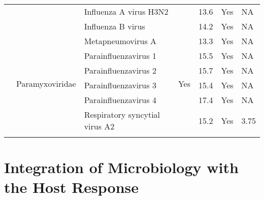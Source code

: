 \begin{center}
\begin{landscape}
\begin{table}[]
{\begin{tabular}{|l|l|l|l|l|l|l|}
                           &                                   & Influenza A virus H3N2         &                      & 13.6        & Yes                  & NA                                           \\ \cline{3-3} \cline{5-7} 
                           &                                   & Influenza B virus              &                      & 14.2        & Yes                  & NA                                           \\ \cline{2-7} 
                           & \multirow{6}{*}{Paramyxoviridae}  & Metapneumovirus A              & \multirow{6}{*}{Yes} & 13.3        & Yes                  & NA                                           \\ \cline{3-3} \cline{5-7} 
                           &                                   & Parainfluenzavirus 1           &                      & 15.5        & Yes                  & NA                                           \\ \cline{3-3} \cline{5-7} 
                           &                                   & Parainfluenzavirus 2           &                      & 15.7        & Yes                  & NA                                           \\ \cline{3-3} \cline{5-7} 
                           &                                   & Parainfluenzavirus 3           &                      & 15.4        & Yes                  & NA                                           \\ \cline{3-3} \cline{5-7} 
                           &                                   & Parainfluenzavirus 4           &                      & 17.4        & Yes                  & NA                                           \\ \cline{3-3} \cline{5-7} 
                           &                                   & Respiratory syncytial virus A2 &                      & 15.2        & Yes                  & 3.75                                         \\ \hline
\small
\end{tabular}
}
\end{table}


\end{landscape}

\clearpage

\end{center}

\chapter{Integration of Microbiology with the Host Response}\label{ch:AppResults3}

